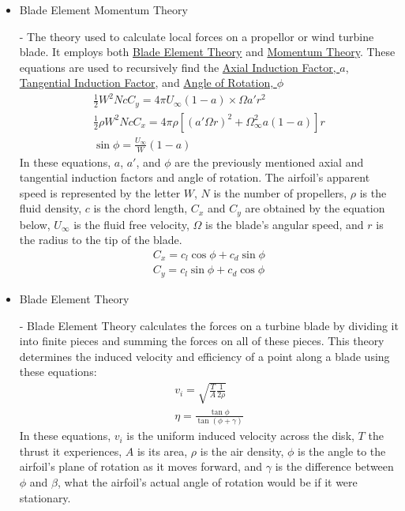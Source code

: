 \documentclass{article}
\begin{document}
\begin{itemize}
	\item \hypertarget{BEM}{Blade Element Momentum Theory} - The theory used to calculate local forces on a propellor or wind turbine blade. It employs both \hyperlink{BET}{Blade Element Theory} and \hyperlink{MT}{Momentum Theory}. These equations are used to recursively find the \hyperlink{a}{Axial Induction Factor, $a$}, \hyperlink{a'}{Tangential Induction Factor}, and \hyperlink{phi}{Angle of Rotation, $\phi$}
	\begin{equation}
	\begin{aligned}
		\frac{1}{2} W^{2} N c C_{y} = 4 \pi U_{\infty} (1 - a) \times \Omega a' r^{2} \\
		\frac{1}{2} \rho W^{2} N c C_{x} = 4 \pi \rho [(a' \Omega r)^{2} + \Omega^{2}_{\infty} a (1 - a)] r \\
		\sin \phi = \frac{U_{\infty}}{W} (1 - a)
	\end{aligned}
	\end{equation}
In these equations, $a$, $a'$, and $\phi$ are the previously mentioned axial and tangential induction factors and angle of rotation. The airfoil's apparent speed is represented by the letter $W$, $N$ is the number of propellers, $\rho$ is the fluid density, $c$ is the chord length, $C_{x}$ and $C_{y}$ are obtained by the equation below, $U_{\infty}$ is the fluid free velocity, $\Omega$ is the blade's angular speed, and $r$ is the radius to the tip of the blade.
	\begin{equation}
	\begin{aligned}
		C_{x} = c_{l} \cos{\phi} + c_{d} \sin{\phi} \\
		C_{y} = c_{l} \sin{\phi} + c_{d} \cos{\phi}
	\end{aligned}
	\end{equation}
	
	\item \hypertarget{BET}{Blade Element Theory} - Blade Element Theory calculates the forces on a turbine blade by dividing it into finite pieces and summing the forces on all of these pieces. This theory determines the induced velocity and efficiency of a point along a blade using these equations:
	\begin{equation}
	\begin{aligned}
		v_{i} = \sqrt{\frac{T}{A} \frac{1}{2 \rho}} \\
        		\eta = \frac{\tan{\phi}}{\tan{(\phi + \gamma)}}
	\end{aligned}
	\end{equation}
In these equations, $v_{i}$ is the uniform induced velocity across the disk, $T$ the thrust it experiences, $A$ is its area, $\rho$ is the air density, $\phi$ is the angle to the airfoil's plane of rotation as it moves forward, and $\gamma$ is the difference between $\phi$ and $\beta$, what the airfoil's actual angle of rotation would be if it were stationary.
	

\end{itemize}
\end{document}
